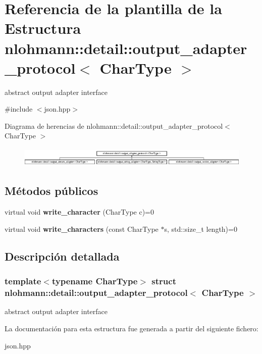 \hypertarget{structnlohmann_1_1detail_1_1output__adapter__protocol}{}\section{Referencia de la plantilla de la Estructura nlohmann\+:\+:detail\+:\+:output\+\_\+adapter\+\_\+protocol$<$ Char\+Type $>$}
\label{structnlohmann_1_1detail_1_1output__adapter__protocol}


abstract output adapter interface  




{\ttfamily \#include $<$json.\+hpp$>$}

Diagrama de herencias de nlohmann\+:\+:detail\+:\+:output\+\_\+adapter\+\_\+protocol$<$ Char\+Type $>$\begin{figure}[H]
\begin{center}
\leavevmode
\includegraphics[height=0.962199cm]{structnlohmann_1_1detail_1_1output__adapter__protocol}
\end{center}
\end{figure}
\subsection*{Métodos públicos}
\begin{DoxyCompactItemize}
\item 
\mbox{\label{structnlohmann_1_1detail_1_1output__adapter__protocol_a3381896fe1be557f591de2e917cdc7d5}} 
virtual void {\bfseries write\+\_\+character} (Char\+Type c)=0
\item 
\mbox{\label{structnlohmann_1_1detail_1_1output__adapter__protocol_a2f410a164e0eda17cf6561114b0eee4a}} 
virtual void {\bfseries write\+\_\+characters} (const Char\+Type $\ast$s, std\+::size\+\_\+t length)=0
\end{DoxyCompactItemize}


\subsection{Descripción detallada}
\subsubsection*{template$<$typename Char\+Type$>$\newline
struct nlohmann\+::detail\+::output\+\_\+adapter\+\_\+protocol$<$ Char\+Type $>$}

abstract output adapter interface 

La documentación para esta estructura fue generada a partir del siguiente fichero\+:\begin{DoxyCompactItemize}
\item 
json.\+hpp\end{DoxyCompactItemize}
